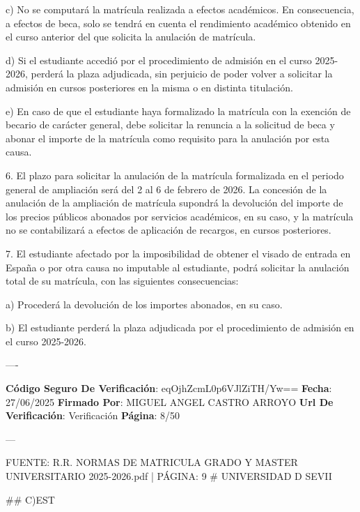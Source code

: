 \documentclass{article}
\begin{document}
\begin{itemize}
\begin{itemize}
\begin{scriptsize}
                  c) No se computará la matrícula realizada a efectos académicos. En consecuencia, a efectos de beca, solo se tendrá en cuenta el rendimiento académico obtenido en el curso anterior del que solicita la anulación de matrícula.

                  d) Si el estudiante accedió por el procedimiento de admisión en el curso 2025-2026, perderá la plaza adjudicada, sin perjuicio de poder volver a solicitar la admisión en cursos posteriores en la misma o en distinta titulación.

                  e) En caso de que el estudiante haya formalizado la matrícula con la exención de becario de carácter general, debe solicitar la renuncia a la solicitud de beca y abonar el importe de la matrícula como requisito para la anulación por esta causa.

                  6. El plazo para solicitar la anulación de la matrícula formalizada en el periodo general de ampliación será del 2 al 6 de febrero de 2026. La concesión de la anulación de la ampliación de matrícula supondrá la devolución del importe de los precios públicos abonados por servicios académicos, en su caso, y la matrícula no se contabilizará a efectos de aplicación de recargos, en cursos posteriores.

                  7. El estudiante afectado por la imposibilidad de obtener el visado de entrada en España o por otra causa no imputable al estudiante, podrá solicitar la anulación total de su matrícula, con las siguientes consecuencias:

                  a) Procederá la devolución de los importes abonados, en su caso.

                  b) El estudiante perderá la plaza adjudicada por el procedimiento de admisión en el curso 2025-2026.

                  ----

                  \textbf{Código Seguro De Verificación}: eqOjhZcmL0p6VJlZiTH/Yw==
                  \textbf{Fecha}: 27/06/2025
                  \textbf{Firmado Por}: MIGUEL ANGEL CASTRO ARROYO
                  \textbf{Url De Verificación}: Verificación
                  \textbf{Página}: 8/50

                  ---

                  FUENTE: R.R. NORMAS DE MATRICULA GRADO Y MASTER UNIVERSITARIO 2025-2026.pdf | PÁGINA: 9
                  \# UNIVERSIDAD D SEVII

                  \#\# C)EST


\end{scriptsize}
\end{itemize}
\end{itemize}
\end{document}
